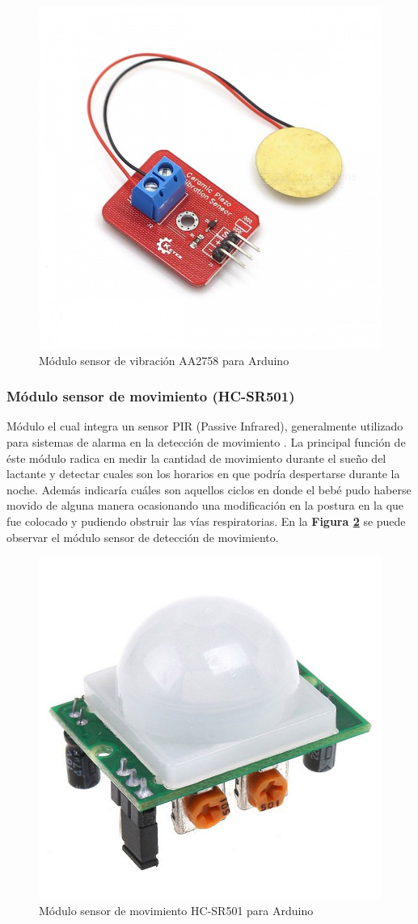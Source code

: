 \documentclass{IEEEtran}
\begin{document}
				\begin{figure}
					\centering
					\includegraphics[width=0.5\linewidth]{arduino-modulo-vibracion}
					\caption{Módulo sensor de vibración AA2758 para Arduino}
					\label{arduino-modulo-vibracion}
				\end{figure}

			\subsubsection{Módulo sensor de movimiento (\textbf{HC-SR501})}
			
				Módulo el cual integra un sensor PIR (Passive Infrared), generalmente utilizado para sistemas de alarma en la detección de movimiento \cite{movimientotecnico}. La principal función de éste módulo radica en medir la cantidad de movimiento durante el sueño del lactante y detectar cuales son los horarios en que podría despertarse durante la noche. Además indicaría cuáles son aquellos ciclos en donde el bebé pudo haberse movido de alguna manera ocasionando una modificación en la postura en la que fue colocado y pudiendo obstruir las vías respiratorias. En la \textbf{Figura \ref{arduino-modulo-movimiento}} se puede observar el módulo sensor de detección de movimiento.

				\begin{figure}
					\centering
					\includegraphics[width=0.5\linewidth]{arduino-modulo-movimiento}
					\caption{Módulo sensor de movimiento HC-SR501 para Arduino}
					\label{arduino-modulo-movimiento}
				\end{figure}
\end{document}
